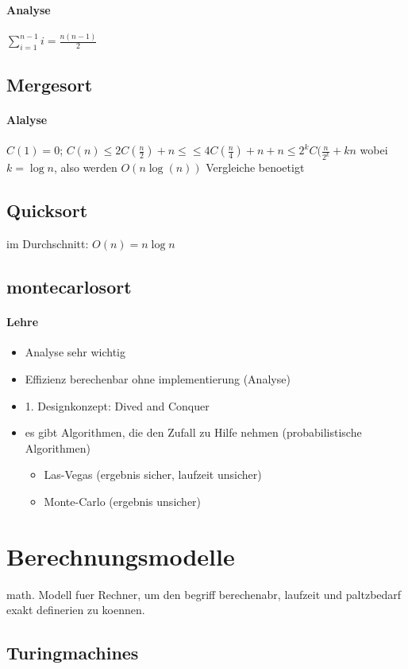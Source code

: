 	\paragraph{Analyse}
	$\sum_{i=1}^{n-1} i = \frac{n(n-1)}{2}$
\subsection{Mergesort}
	\paragraph{Alalyse}
	$C(1) = 0$;
	$C(n)\leq 2 C(\frac{n}{2}) + n \leq
	 \leq 4 C(\frac{n}{4}) + n + n 
	 \leq 2^k C(\frac{n}{2^k} + kn$ wobei $k=\log n$, also
	werden $O(n\log(n))$ Vergleiche benoetigt
\subsection{Quicksort}
	im Durchschnitt: $O(n) = n \log n$
\subsection{montecarlosort}

\paragraph{Lehre}
\begin{itemize}
\item Analyse sehr wichtig
\item Effizienz berechenbar ohne implementierung (Analyse)
\item 1. Designkonzept: Dived and Conquer
\item es gibt Algorithmen, die den Zufall zu Hilfe nehmen
	(probabilistische Algorithmen)
	\begin{itemize}
	\item Las-Vegas (ergebnis sicher, laufzeit unsicher)
	\item Monte-Carlo (ergebnis unsicher)
	\end{itemize}
\end{itemize}

\section{Berechnungsmodelle}
math. Modell fuer Rechner, um den begriff berechenabr, laufzeit und paltzbedarf
exakt definerien zu koennen.

\subsection{Turingmachines}
